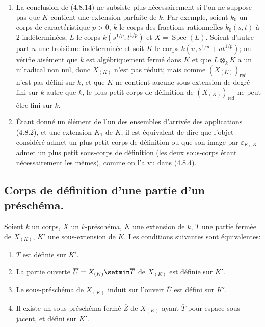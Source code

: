 \begin{remarks}[4.8.15]
\label{IV.2.4.8.15-fr}
\begin{enumerate}
\item[(i)] La conclusion de (4.8.14) ne subsiste plus nécessairement si l'on
ne suppose pas que $K$ contient une extension parfaite de $k$. Par exemple,
soient $k_0$
un corps de caractéristique $p>0$, $k$ le corps des fractions
rationnelles $k_0(s,t)$ à $2$ indéterminées, $L$ le corps
$k(s^{1/p},t^{1/p})$ et $X=\operatorname{Spec}(L)$. Soient d'autre part $u$
une troisième indéterminée et soit $K$ le corps
$k(u,s^{1/p}+ut^{1/p})$; on vérifie aisément que $k$ est algébriquement fermé
dans $K$ et que $L\otimes_kK$ a un nilradical non nul, donc $X_{(K)}$ n'est
pas réduit; mais comme $(X_{(K)})_{\mathrm{red}}$ n'est pas défini sur $k$,
et que $K$ ne contient aucune sous-extension de degré fini sur $k$ autre que
$k$, le plus petit corps de définition de $(X_{(K)})_{\mathrm{red}}$ ne peut
être fini sur $k$.

\item[(ii)] Étant donné un élément de l'un des ensembles d'arrivée des
applications (4.8.2), et une extension $K_1$ de $K$, il est équivalent de dire
que l'objet considéré admet un plus petit corps de définition ou que son image
par $\varepsilon_{K_1,K}$ admet un plus petit sous-corps de définition (les
deux sous-corps étant nécessairement les mêmes), comme on l'a vu dans
(4.8.4).
\end{enumerate}
\end{remarks}
\subsection{Corps de définition d'une partie d'un préschéma.}

\begin{proposition}[4.9.1]
\label{IV.2.4.9.1-fr}
Soient $k$ un corps, $X$ un $k$-préschéma, $K$ une extension de $k$,
$\overline T$ une partie fermée de $X_{(K)}$, $K'$ une sous-extension de $K$.
Les conditions suivantes sont équivalentes:
\begin{enumerate}
\item[\textup{a)}] $\overline T$ est définie sur $K'$.
\item[\textup{b)}] La partie ouverte $\overline U=X_{(K)}\setmin\overline T$ de $X_{(K)}$
est définie sur $K'$.
\item[\textup{b')}] Le sous-préschéma de $X_{(K)}$ induit sur l'ouvert $\overline U$
est défini sur $K'$.
\item[\textup{c)}] Il existe un sous-préschéma fermé $\overline Z$ de $X_{(K)}$ ayant
$\overline T$ pour espace sous-jacent, et défini sur $K'$.
\end{enumerate}
\end{proposition}

